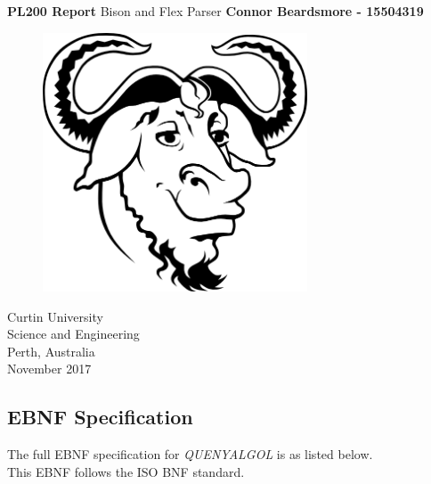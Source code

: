 \documentclass[]{article}
\begin{document}


	

\begin{titlepage}
	\begin{center}
		\vspace*{1cm}
		\LARGE\textbf{PL200 Report}
		\break
		Bison and Flex Parser
		\vspace{1cm}
		\break
		\Large\textbf{Connor Beardsmore - 15504319} 
		\vspace{2cm}
		\begin{figure}[H]
			\begin{center}
				{ 
					\includegraphics[height=0.4\textheight,width=0.7\textwidth]{placeholder.png}}
			\end{center}
		\end{figure}
		
		\vspace{4cm}
		\normalsize
		Curtin University \\
		Science and Engineering \\
		Perth, Australia \\
		November 2017
		
	\end{center}
\end{titlepage}


\begin{center}
	\section*{EBNF Specification}
\end{center}
\vspace{0.5cm}
The full EBNF specification for \textit{QUENYALGOL} is as listed below. \\This EBNF follows the ISO BNF standard.
\vspace{1cm}
\end{document}
